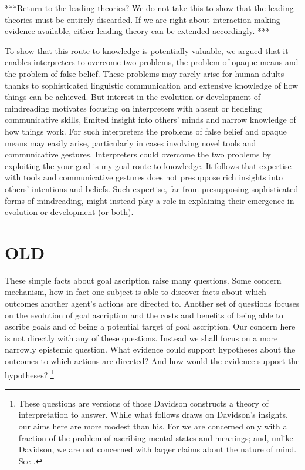 \documentclass[14pt,a4paper]{extarticle}
\begin{document}
***Return to the leading theories?
We do not take this to show that the leading theories must be entirely discarded.
If we are right about interaction making evidence available, 
either leading theory can be extended accordingly.
***


To show that this route to knowledge is potentially valuable,
we argued that it enables interpreters to overcome two problems,
the problem of opaque means
and the problem of false belief.
These problems may rarely arise for human adults thanks to sophisticated linguistic communication and extensive knowledge of how things can be achieved.  
But interest in the evolution or development of mindreading
motivates focusing on 
interpreters with
  absent or fledgling communicative skills,
  limited insight into others' minds
  and narrow knowledge of how things work.
For such interpreters
the problems of false belief and opaque means may easily arise,
particularly in cases involving novel tools 
and 
communicative gestures.
Interpreters 
could overcome the two problems 
by exploiting the your-goal-is-my-goal route to knowledge.
It follows that 
expertise with 
  tools 
  and
  communicative gestures
does not presuppose rich insights into others' intentions and beliefs.
Such expertise,
far from  presupposing sophisticated forms of mindreading,
might instead
play a role in explaining their emergence in evolution or development (or both).




\section{OLD}

These simple facts about goal ascription raise many questions.
Some concern mechanism, how in fact one subject is able to discover facts about which outcomes another agent's actions are directed to.
Another set of questions focuses on the evolution of goal ascription and the costs and benefits of being able to ascribe goals and of being a potential target of goal ascription.
Our concern here is not directly with any of these questions.
Instead we shall focus on a more narrowly epistemic question.
What evidence could support hypotheses about the outcomes to which actions are directed?
And how would the evidence support the hypotheses?%
\footnote{
These questions are versions of those Davidson constructs a theory of interpretation to answer.
While what follows draws  on Davidson's insights,
our aims here are more modest than his.
For we are concerned only with a  fraction of the problem of ascribing mental states and meanings;
and, unlike Davidson, we are not concerned with larger claims about the nature of mind.
See
\citet{Davidson:1973jx,Davidson:1990du,lepore_donald_2005}.
}
\end{document}
